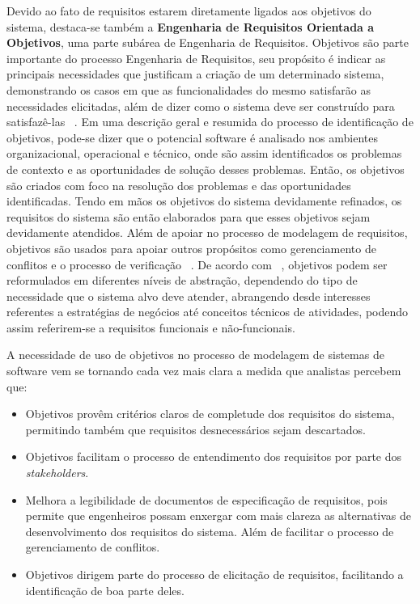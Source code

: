 Devido ao fato de requisitos estarem diretamente ligados aos objetivos do sistema, destaca-se também a \textbf{Engenharia de Requisitos Orientada a Objetivos}, uma parte subárea de Engenharia de Requisitos. Objetivos são parte importante do processo Engenharia de Requisitos, seu propósito é indicar as principais necessidades que justificam a criação de um determinado sistema, demonstrando os casos em que as funcionalidades do mesmo satisfarão as necessidades elicitadas, além de dizer como o sistema deve ser construído para satisfazê-las ~\cite{ross1977structured}. Em uma descrição geral e resumida do processo de identificação de objetivos, pode-se dizer que o potencial software é analisado nos ambientes organizacional, operacional e técnico, onde são assim identificados os problemas de contexto e as oportunidades de solução desses problemas. Então, os objetivos são criados com foco na resolução dos problemas e das oportunidades identificadas. Tendo em mãos os objetivos do sistema devidamente refinados, os requisitos do sistema são então elaborados para que esses objetivos sejam devidamente atendidos. Além de apoiar no processo de modelagem de requisitos, objetivos são usados para apoiar outros propósitos como gerenciamento de conflitos e o processo de verificação ~\cite{van2001goal}. De acordo com ~\cite{van2001goal}, objetivos podem ser reformulados em diferentes níveis de abstração, dependendo do tipo de necessidade que o sistema alvo deve atender, abrangendo desde interesses referentes a estratégias de negócios até conceitos técnicos de atividades, podendo assim referirem-se a requisitos funcionais e não-funcionais.

A necessidade de uso de objetivos no processo de modelagem de sistemas de software vem se tornando cada vez mais clara a medida que analistas percebem que:
\begin{itemize}
	\item Objetivos provêm critérios claros de completude dos requisitos do sistema, permitindo também que requisitos desnecessários sejam descartados.
	\item Objetivos facilitam o processo de entendimento dos requisitos por parte dos \textit{stakeholders}.
	\item Melhora a legibilidade de documentos de especificação de requisitos, pois permite que engenheiros possam enxergar com mais clareza as alternativas de desenvolvimento dos requisitos do sistema. Além de facilitar o processo de gerenciamento de conflitos.
	\item Objetivos dirigem parte do processo de elicitação de requisitos, facilitando a identificação de boa parte deles.	
\end{itemize}

